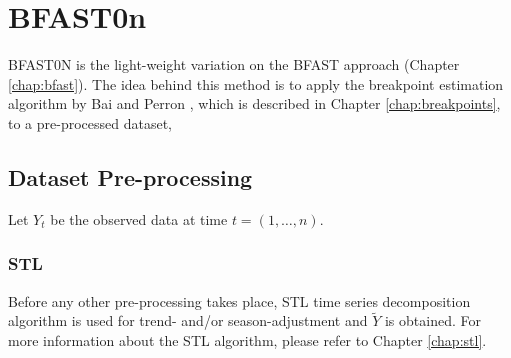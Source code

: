 \documentclass[main.tex]{subfiles}
\begin{document}
\chapter{BFAST0n}
\label{chap:bfast0n}
BFAST0N is the light-weight variation on the BFAST approach (Chapter
\ref{chap:bfast}). The idea behind this method is to apply the breakpoint
estimation algorithm by Bai and Perron \cite{bai_perron},  which is described in Chapter
\ref{chap:breakpoints},  to a pre-processed dataset,

\section{Dataset Pre-processing}
\label{sec:harmonic_model}
Let $Y_t$ be the observed data at time $t = (1, \hdots, n)$.
\subsection{STL}
\label{subsec:stl}
Before any other pre-processing takes place, STL time series decomposition algorithm is
used for trend- and/or season-adjustment and $\tilde{Y}$ is obtained.
For more information about the STL algorithm, please refer to Chapter {\ref{chap:stl}}.
\end{document}
